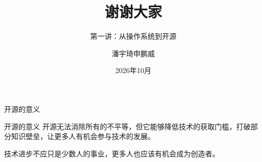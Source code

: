 \documentclass[aspectratio=169]{beamer}
\begin{document}
\begin{frame}{开源的意义}
	\begin{block}{开源的意义}
		\hspace*{2em}开源无法消除所有的不平等，但它能够降低技术的获取门槛，打破部分知识壁垒，让更多人有机会参与技术的发展。
		\par\hspace*{2em}\alert{技术进步不应只是少数人的事业，更多人也应该有机会成为创造者。}
	\end{block}
\end{frame}



\begin{frame}
	\title{谢谢大家}
	\subtitle{第一讲：从操作系统到开源}
	\author{潘宇琦\hspace*{1em}申鹏威}
	\date{2026年10月}
	\titlepage
\end{frame}

	
\end{document}
